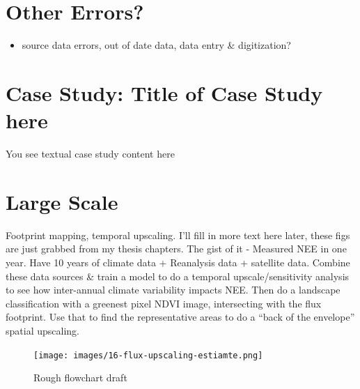 \documentclass[
]{book}
\providecommand{\tightlist}{%
  \setlength{\itemsep}{0pt}\setlength{\parskip}{0pt}}
\begin{document}
\hypertarget{other-errors}{%
\section{Other Errors?}\label{other-errors}}

\begin{itemize}
\tightlist
\item
  source data errors, out of date data, data entry \& digitization?
\end{itemize}

\hypertarget{case-study-title-of-case-study-here-9}{%
\section{Case Study: Title of Case Study here}\label{case-study-title-of-case-study-here-9}}

You see textual case study content here

\hypertarget{box-text}{%
\section*{Large Scale}\label{box-text}}

Footprint mapping, temporal upscaling. I'll fill in more text here later, these figs are just grabbed from my thesis chapters. The gist of it - Measured NEE in one year. Have 10 years of climate data + Reanalysis data + satellite data. Combine these data sources \& train a model to do a temporal upscale/sensitivity analysis to see how inter-annual climate variability impacts NEE. Then do a landscape classification with a greenest pixel NDVI image, intersecting with the flux footprint. Use that to find the representative areas to do a ``back of the envelope'' spatial upscaling.

\begin{figure}
\centering
\texttt{[image: images/16-flux-upscaling-estiamte.png]}
\caption{Rough flowchart draft}
\end{figure}
\end{document}
